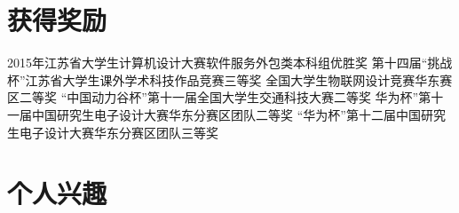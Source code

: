 \documentclass[11pt, a4paper]{moderncv}
\begin{document}
	\section{获得奖励}
	{2015年江苏省大学生计算机设计大赛软件服务外包类本科组优胜奖}{}{}{}{}
	{第十四届“挑战杯”江苏省大学生课外学术科技作品竞赛三等奖}{}{}{}{}
	{全国大学生物联网设计竞赛华东赛区二等奖}{}{}{}{}
	{“中国动力谷杯”第十一届全国大学生交通科技大赛二等奖}{}{}{}{}
	{华为杯”第十一届中国研究生电子设计大赛华东分赛区团队二等奖}{}{}{}{}
	{“华为杯”第十二届中国研究生电子设计大赛华东分赛区团队三等奖 }{}{}{}{}

	\section{个人兴趣}
\end{document}

